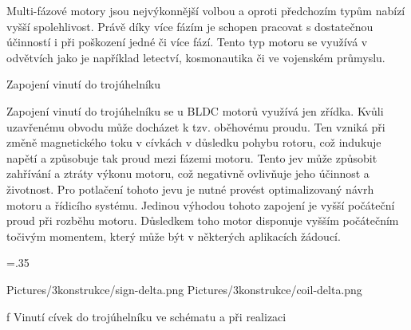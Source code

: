 Multi-fázové motory jsou nejvýkonnější volbou a oproti předchozím typům nabízí vyšší spolehlivost. 
Právě díky více fázím je schopen pracovat s dostatečnou účinností i při poškození jedné či více fází. 
Tento typ motoru se využívá v odvětvích jako je například letectví, kosmonautika či ve vojenském průmyslu. 

\secc Zapojení vinutí do trojúhelníku


Zapojení vinutí do trojúhelníku se u BLDC motorů využívá jen zřídka. Kvůli uzavřenému obvodu může docházet k tzv. oběhovému proudu.
Ten vzniká při změně magnetického toku v cívkách v důsledku pohybu rotoru, což indukuje napětí a způsobuje tak
proud mezi fázemi motoru. Tento jev může způsobit zahřívání a ztráty výkonu motoru, což negativně ovlivňuje jeho účinnost a životnost. 
Pro potlačení tohoto jevu je nutné provést optimalizovaný návrh motoru a řídicího systému. 
Jedinou výhodou tohoto zapojení je vyšší počáteční proud při rozběhu motoru. Důsledkem toho motor disponuje 
vyšším počátečním točivým momentem, který může být v některých aplikacích žádoucí. 

\medskip
\picw=.35\hsize
{} %
\centerline {\inspic Pictures/3konstrukce/sign-delta.png  \hfil\hfil \inspic Pictures/3konstrukce/coil-delta.png  }\nobreak
\caption/f Vinutí cívek do trojúhelníku ve schématu a při realizaci
 \medskip

